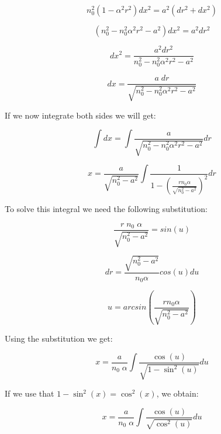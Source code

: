 \documentclass{article}
\begin{document}
\begin{equation*}
	n_0^2 (1 - \alpha ^2 r^2)  dx^2 = a^2 (dr^2 + dx^2)
\end{equation*}

\begin{equation*}
	(n_0 ^2 - n_0^2 \alpha ^2 r^2 - a^2)  dx^2 = a^2 dr^2
\end{equation*}

\begin{equation*}
	dx^2 =\frac{a^2 dr^2}{n_0 ^2 - n_0^2 \alpha ^2 r^2 - a^2}
\end{equation*}

\begin{equation}
	dx =\frac{a \; dr}{\sqrt{n_0 ^2 - n_0^2 \alpha ^2 r^2 - a^2}}
	\label{eq:drdx}
\end{equation}


If we now integrate both sides we will get:

\begin{equation*}
	\int dx = \int \frac{a}{\sqrt{n_0 ^2 - n_0^2 \alpha ^2 r^2 - a^2}} dr
\end{equation*}

\begin{equation*}
	x = \frac{a}{\sqrt{n_0^2 - a^2}} \int \frac{1}{1 - \left( \frac{r n_0 \alpha}{\sqrt{n_0^2-a^2}} \right) ^2} dr
\end{equation*}

To solve this integral we need the following substitution:

\begin{equation*}
	 \frac{r \; n_0 \; \alpha}{\sqrt{n_0^2-a^2}} = sin(u)
\end{equation*}

\begin{equation*}
	 dr = \frac{\sqrt{n_0^2-a^2}}{n_0 \alpha} cos(u) du
\end{equation*}

\begin{equation*}
	 u = arcsin \left( \frac{r n_0 \alpha}{\sqrt{n_0^2-a^2}} \right)
\end{equation*}

Using the substitution we get:

\begin{equation*}
	x = \frac{a}{n_0 \; \alpha} \int \frac{\cos (u)}{\sqrt{1 - \sin^2 (u)}} du
\end{equation*}

If we use that $1 - \sin^2 (x) = \cos^2 (x)$, we obtain:

\begin{equation*}
	x = \frac{a}{n_0 \; \alpha} \int \frac{\cos (u)}{\sqrt{\cos^2 (u)}} du
\end{equation*}
\end{document}
